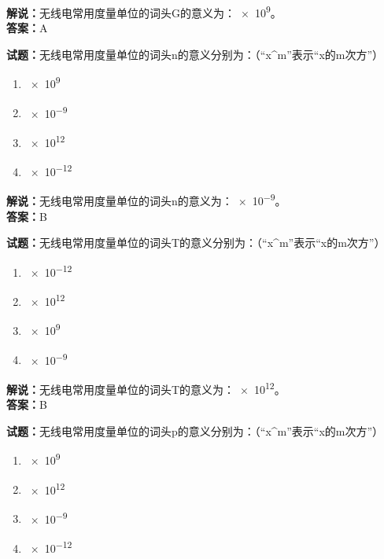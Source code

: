 \documentclass{ctexbook}
\begin{document}
\noindent\textbf{解说：}无线电常用度量单位的词头G的意义为：\num{e9}。\\
\noindent\textbf{答案：}A

\bigskip

\noindent\textbf{试题：}无线电常用度量单位的词头n的意义分别为：（“x\string^m”表示“x的m次方”）

\begin{enumerate}[leftmargin=3em]
  \item \num{e9}%
  \item \num{e-9}%
  \item \num{e12}%
  \item \num{e-12}%
\end{enumerate}

\noindent\textbf{解说：}无线电常用度量单位的词头n的意义为：\num{e-9}。\\
\noindent\textbf{答案：}B

\bigskip

\noindent\textbf{试题：}无线电常用度量单位的词头T的意义分别为：（“x\string^m”表示“x的m次方”）

\begin{enumerate}[leftmargin=3em]
  \item \num{e-12}%
  \item \num{e12}%
  \item \num{e9}%
  \item \num{e-9}%
\end{enumerate}

\noindent\textbf{解说：}无线电常用度量单位的词头T的意义为：\num{e12}。\\
\noindent\textbf{答案：}B

\bigskip

\noindent\textbf{试题：}无线电常用度量单位的词头p的意义分别为：（“x\string^m”表示“x的m次方”）

\begin{enumerate}[leftmargin=3em]
  \item \num{e9}%
  \item \num{e12}%
  \item \num{e-9}%
  \item \num{e-12}%
\end{enumerate}
\end{document}
